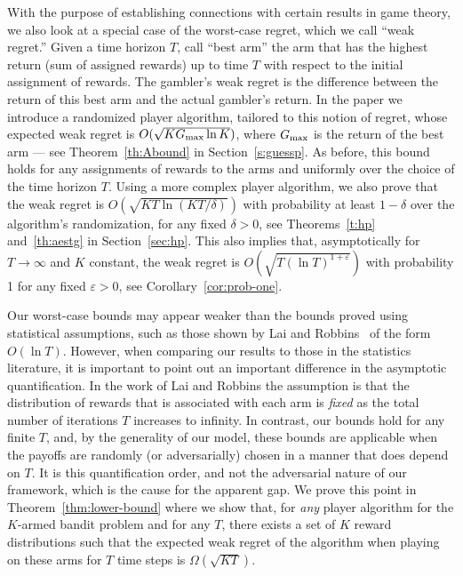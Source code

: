 \documentclass[12pt]{article}
\newcommand{\ve}{\varepsilon}
\newcommand{\Gbest}{G_{\rm max}}
\begin{document}
With the purpose of establishing connections with certain results in game theory,
we also look at a special case of the worst-case regret, which we call ``weak regret.''
Given a time horizon $T$, call ``best arm'' the arm that has the highest return
(sum of assigned rewards) up to time $T$ with respect to the initial assignment of rewards.
The gambler's weak regret is the difference between the return
of this best arm and the actual gambler's return.
In the paper we introduce a randomized player algorithm, tailored to
this notion of regret, whose expected weak regret is
$O(\sqrt{K\Gbest\ln K})$, where $\Gbest$ is the return of the best arm
--- see Theorem~\ref{th:Abound} in Section~\ref{s:guessp}.
As before, this bound holds for any assignments of rewards to the arms
and uniformly over the choice of the time horizon $T$.
Using a more complex player algorithm, we also prove that the weak regret
is $O(\sqrt{KT\ln(KT/\delta)})$ with probability at least $1-\delta$ over
the algorithm's randomization, for
any fixed $\delta > 0$, see Theorems~\ref{t:hp} and~\ref{th:aestg} in
Section~\ref{sec:hp}. This also implies that, asymptotically for $T\to\infty$
and $K$ constant, the weak regret is $O(\sqrt{T(\ln T)^{1+\ve}})$ with probability 1
for any fixed $\ve > 0$, see Corollary~\ref{cor:prob-one}.

Our worst-case bounds may appear weaker than the bounds proved using
statistical assumptions, such as those shown by Lai and Robbins~\cite{LaiRo85}
of the form $O(\ln T)$.
However, when comparing our results to those in the statistics
literature, it is important to point out an important difference in
the asymptotic quantification. In the work of Lai and Robbins the assumption
is that the distribution of rewards that is
associated with each arm is {\em fixed} as the total number of iterations $T$
increases to infinity. In contrast, our bounds hold for any finite
$T$, and, by the generality of our model, these bounds are applicable
when the payoffs are randomly (or adversarially) chosen in a manner
that does depend on $T$.
It is this quantification order, and not the adversarial nature of our
framework, which is the cause for the apparent gap. We prove this
point in Theorem~\ref{thm:lower-bound} where we show that, for {\em any}
player algorithm for the $K$-armed bandit problem and for any $T$, there
exists a set of $K$ reward distributions such that the expected weak regret
of the algorithm when playing on these arms for $T$ time steps is
$\Omega(\sqrt{KT})$.
\end{document}
